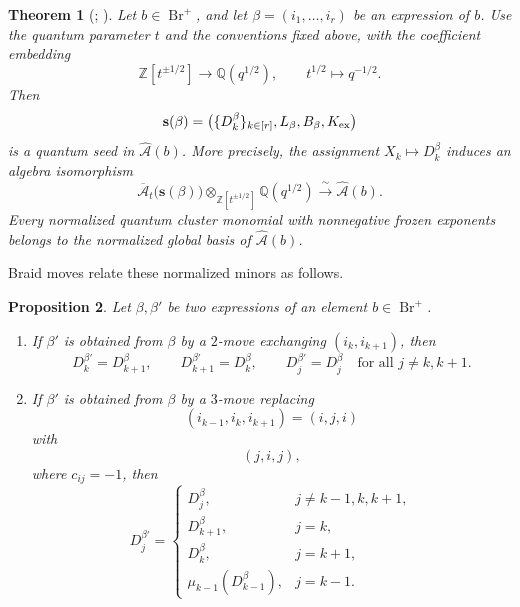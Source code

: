 \documentclass[12pt, reqno]{amsart}
\theoremstyle{plain}
\newtheorem{theorem}{Theorem}[section]
\newtheorem{proposition}[theorem]{Proposition}
\theoremstyle{definition}
\numberwithin{equation}{section}
\newcommand{\Br}{{\operatorname{Br}}}
\begin{document}
\begin{theorem}[{\cite[Theorem~9.7]{kashiwara2025monoidal}; \cite{bi2025cluster}}]
Let $b\in\Br^+$, and let $\beta=(i_1,\ldots,i_r)$ be an expression of $b$.
Use the quantum parameter $t$ and the conventions fixed above, with the
coefficient embedding
\[
    \mathbb Z[t^{\pm1/2}]\longrightarrow\mathbb Q(q^{1/2}),
    \qquad t^{1/2}\longmapsto q^{-1/2}.
\]
Then
\[
    \mathbf s(\beta)
    =\bigl(\{D_k^\beta\}_{k\in[r]},L_\beta,B_\beta,K_{\rm ex}\bigr)
\]
is a quantum seed in $\widehat{\mathcal A}(b)$. More precisely, the
assignment $X_k\mapsto D_k^\beta$ induces an algebra isomorphism
\[
    \overline{\mathcal A}_t\bigl(\mathbf s(\beta)\bigr)
    \otimes_{\mathbb Z[t^{\pm1/2}]}\mathbb Q(q^{1/2})
    \xrightarrow{\ \sim\ }\widehat{\mathcal A}(b).
\]
Every normalized quantum cluster monomial with nonnegative frozen
exponents belongs to the normalized global basis of
$\widehat{\mathcal A}(b)$.
\end{theorem}
Braid moves relate these normalized minors as follows.

\begin{proposition}\label{prop:Dbraid}
Let \(\beta,\beta'\) be two expressions of an element \(b\in\Br^+\).
\begin{enumerate}
    \item If \(\beta'\) is obtained from \(\beta\) by a \(2\)-move exchanging
    \((i_k,i_{k+1})\), then
    \[
    D^{\beta'}_k = D^\beta_{k+1},\qquad
    D^{\beta'}_{k+1} = D^\beta_k,\qquad
    D^{\beta'}_j = D^\beta_j \quad \text{for all } j\neq k,k+1.
    \]

    \item If \(\beta'\) is obtained from \(\beta\) by a \(3\)-move replacing
    \[
    (i_{k-1},i_k,i_{k+1})=(i,j,i)
    \]
    with
    \[
    (j,i,j),
    \]
    where \(c_{ij}=-1\), then
    \[
    D^{\beta'}_j=
    \begin{cases}
        D^\beta_j, & j\neq k-1,k,k+1,\\
        D^\beta_{k+1}, & j=k,\\
        D^\beta_k, & j=k+1,\\
        \mu_{k-1}(D^\beta_{k-1}), & j=k-1.
    \end{cases}
    \]
\end{enumerate}
\end{proposition}
\end{document}
